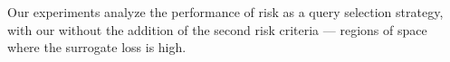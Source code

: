 \documentclass[10pt, conference]{ieeeconf}      %
\newcommand{\bx}{\mathbf{x}}
\newcommand{\acro}{SHIV}
\begin{document}
Our experiments analyze the performance of risk as a query selection strategy, with our without the addition of the second risk criteria --- regions of space where the surrogate loss is high.




 
 
\end{document}
